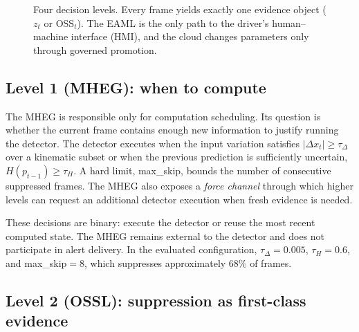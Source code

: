 \documentclass[conference]{IEEEtran}
\newcommand{\osst}{\mathrm{OSS}_t}
\begin{document}
\begin{figure}[!t]
{%
}
\caption{Four decision levels. Every frame yields exactly one evidence
object ($z_t$ or $\osst$). The EAML is the only path to the driver's
human--machine interface (HMI), and the cloud changes parameters only
through governed promotion.}
\label{fig:arch}
\end{figure}

\subsection{Level 1 (MHEG): when to compute}

The MHEG is responsible only for computation scheduling. Its question is
whether the current frame contains enough new information to justify
running the detector. The detector executes when the input variation
satisfies $|\Delta x_t|\geq\tau_\Delta$ over a kinematic subset or when
the previous prediction is sufficiently uncertain,
$H(p_{t-1})\geq\tau_H$. A hard limit, max\_skip, bounds the number of
consecutive suppressed frames. The MHEG also exposes a \emph{force
channel} through which higher levels can request an additional detector
execution when fresh evidence is needed.

These decisions are binary: execute the detector or reuse the most recent
computed state. The MHEG remains external to the detector and does not
participate in alert delivery. In the evaluated configuration,
$\tau_\Delta{=}0.005$, $\tau_H{=}0.6$, and max\_skip${=}8$, which
suppresses approximately 68\% of frames.

\subsection{Level 2 (OSSL): suppression as first-class evidence}
\end{document}
